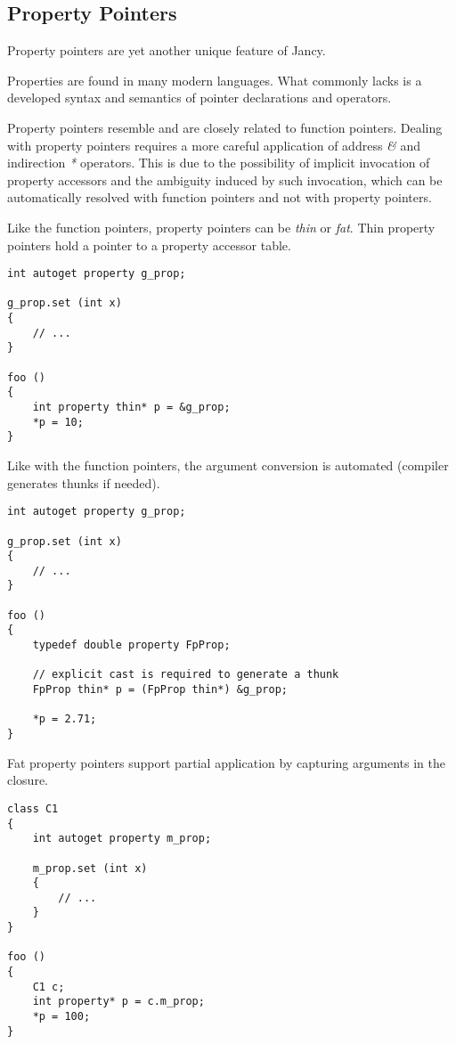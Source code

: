 \documentclass[oneside]{book}
\begin{document}
\subsection{Property Pointers}

Property pointers are yet another unique feature of Jancy.

Properties are found in many modern languages. What commonly lacks is a developed syntax and semantics of pointer declarations and operators.

Property pointers resemble and are closely related to function pointers. Dealing with property pointers requires a more careful application of address \emph{\&} and indirection \emph{*} operators. This is due to the possibility of implicit invocation of property accessors and the ambiguity induced by such invocation, which can be automatically resolved with function pointers and not with property pointers.

Like the function pointers, property pointers can be \emph{thin} or \emph{fat}. Thin property pointers hold a pointer to a property accessor table.

\begin{lstlisting}
int autoget property g_prop;

g_prop.set (int x)
{
    // ...
}

foo ()
{
    int property thin* p = &g_prop;
    *p = 10;    
}
\end{lstlisting}

Like with the function pointers, the argument conversion is automated (compiler generates thunks if needed).

\begin{lstlisting}
int autoget property g_prop;

g_prop.set (int x)
{
    // ...
}

foo ()
{
    typedef double property FpProp; 

    // explicit cast is required to generate a thunk
    FpProp thin* p = (FpProp thin*) &g_prop; 

    *p = 2.71;  
}
\end{lstlisting}

Fat property pointers support partial application by capturing arguments in the closure.

\begin{lstlisting}
class C1
{
    int autoget property m_prop;

    m_prop.set (int x)
    {
        // ...
    }
}

foo ()
{
    C1 c;
    int property* p = c.m_prop;
    *p = 100;
}
\end{lstlisting}
\end{document}
